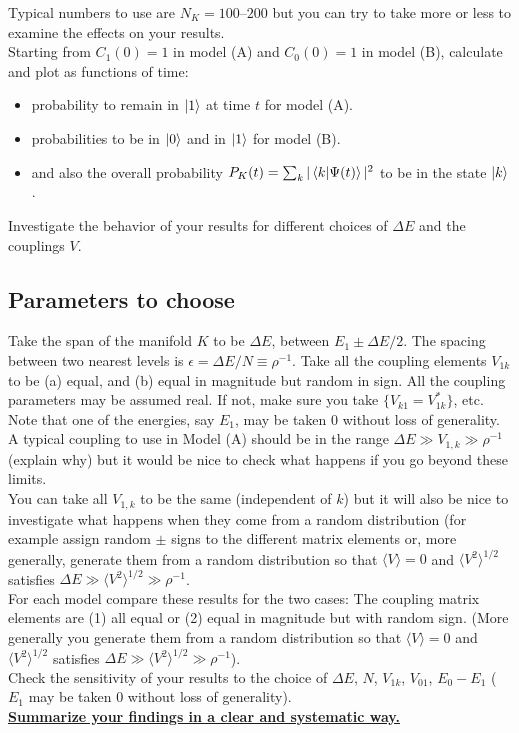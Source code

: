 \documentclass[11pt]{article}
\begin{document}
\bigskip\bigskip

\noindent Typical numbers to use are $N_K = 100$--$200$ but you can try to take more or less to examine the effects on your results.\\

\noindent Starting from $C_1(0)=1$ in model (A) and $C_0(0)=1$ in model (B), calculate and plot as functions of time:

\begin{itemize}
\item probability to remain in $\ket{1}$ at time $t$ for model (A).
\item probabilities to be in $\ket{0}$ and in $\ket{1}$ for model (B).
\item and also the overall probability $P_K(t)=\sum_k |\braket{k|\Psi(t)}|^2$ to be in the state $\ket{k}$. 
\end{itemize}
Investigate the behavior of your results for different choices of $\Delta E$ and the couplings $V$. 

\subsection*{Parameters to choose}
Take the span of the manifold $K$ to be $\Delta E$, between $E_1 \pm \Delta E/2$. The spacing between two nearest levels is $\epsilon = \Delta E / N \equiv \rho^{-1}$. Take all the coupling elements $V_{1k}$ to be (a) equal, and (b) equal in magnitude but random in sign. 
All the coupling parameters may be assumed real. If not, make sure you take $\{ V_{k1} = V_{1k}^* \}$, etc. Note that one of the energies, say $E_1$, may be taken 0 without loss of generality.\\

\noindent A typical coupling to use in Model (A) should be in the range $\Delta E \gg V_{1,k} \gg \rho^{-1}$ (explain why) but it would be nice to check what happens if you go beyond these limits.\\

\noindent You can take all $V_{1,k}$ to be the same (independent of $k$) but it will also be nice to investigate what happens when they come from a random distribution (for example assign random $\pm$ signs to the different matrix elements or, more generally, generate them from a random distribution so that $\langle V \rangle = 0$ and $\langle V^2 \rangle^{1/2}$ satisfies $\Delta E \gg \langle V^2 \rangle^{1/2} \gg \rho^{-1}$.\\

\noindent For each model compare these results for the two cases: The coupling matrix elements are (1) all equal or (2) equal in magnitude but with random sign. (More generally you generate them from a random distribution so that $\langle V \rangle = 0$ and $\langle V^2 \rangle^{1/2}$ satisfies $\Delta E \gg \langle V^2 \rangle^{1/2} \gg \rho^{-1}$). \\

\noindent Check the sensitivity of your results to the choice of $\Delta E$, $N$, $V_{1k}$, $V_{01}$, $E_0-E_1$ ($E_1$ may be taken 0 without loss of generality). \\

\noindent \underline{\bf Summarize your findings in a clear and systematic way.}
\end{document}
